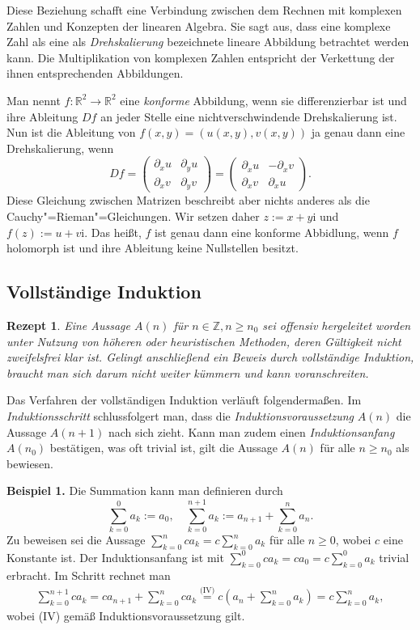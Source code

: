 \documentclass[a4paper,10pt,fleqn,twocolumn,twoside,dvipdfmx]{scrartcl}
\theoremstyle{rmbox}
\newtheorem{Rezept}{Rezept}[section]
\newcommand{\strong}[1]{\textsf{\textbf{#1}}}
\newcommand{\ui}{\mathrm{i}}
\newcommand{\Z}{\mathbb Z}
\newcommand{\R}{\mathbb R}
\begin{document}
Diese Beziehung schafft eine Verbindung zwischen dem
Rechnen mit komplexen Zahlen und Konzepten der linearen Algebra.
Sie sagt aus, dass eine komplexe Zahl als eine als \emph{Drehskalierung}
bezeichnete lineare Abbildung betrachtet werden kann. Die Multiplikation
von komplexen Zahlen entspricht der Verkettung der ihnen entsprechenden
Abbildungen.

Man nennt $f\colon\R^2\to\R^2$ eine \emph{konforme} Abbildung, wenn sie
differenzierbar ist und ihre Ableitung $Df$ an jeder Stelle
eine nichtverschwindende Drehskalierung ist. Nun ist die
Ableitung von $f(x,y)=(u(x,y),v(x,y))$ ja genau dann eine
Drehskalierung, wenn
\[Df = \begin{pmatrix}
\partial_x u & \partial_y u\\
\partial_x v & \partial_y v
\end{pmatrix} = \begin{pmatrix}
\partial_x u & -\partial_x v\\
\partial_x v & \partial_x u
\end{pmatrix}.\]
Diese Gleichung zwischen Matrizen beschreibt aber nichts anderes als
die Cauchy"=Rieman"=Gleichungen. Wir setzen daher $z:=x+y\ui$ und
$f(z):=u+v\ui$. Das heißt, $f$ ist genau dann eine konforme
Abbidlung, wenn $f$ holomorph ist und ihre Ableitung keine
Nullstellen besitzt.

\subsection{Vollständige Induktion}

\begin{Rezept}
Eine Aussage $A(n)$ für $n\in\Z, n\ge n_0$ sei offensiv
hergeleitet worden unter Nutzung von höheren oder
heuristischen Methoden, deren Gültigkeit nicht zweifelsfrei
klar ist. Gelingt anschließend ein Beweis durch vollständige
Induktion, braucht man sich darum nicht weiter kümmern
und kann voranschreiten.
\end{Rezept}
Das Verfahren der vollständigen Induktion verläuft folgendermaßen.
Im \emph{Induktionsschritt} schlussfolgert man, dass die
\emph{Induktionsvoraussetzung} $A(n)$ die Aussage $A(n+1)$ nach sich
zieht. Kann man zudem einen \emph{Induktionsanfang}
$A(n_0)$ bestätigen, was oft trivial ist, gilt die Aussage $A(n)$
für alle $n\ge n_0$ als bewiesen.

\strong{Beispiel 1.} Die Summation kann man definieren durch%
\[\sum_{k=0}^0 a_k := a_0,\quad
\sum_{k=0}^{n+1} a_k := a_{n+1}+\sum_{k=0}^n a_n.
\]
Zu beweisen sei die Aussage $\sum_{k=0}^n ca_k = c\sum_{k=0}^n a_k$
für alle $n\ge 0$, wobei
$c$ eine Konstante ist. Der Induktionsanfang ist mit
$\sum_{k=0}^0 ca_k = ca_0 = c\sum_{k=0}^0 a_k$
trivial erbracht. Im Schritt rechnet man%
\begin{gather*}
\sum_{k=0}^{n+1} ca_k = ca_{n+1}+\sum_{k=0}^n ca_k
\!\!\stackrel{\text{(IV)}}=\! c(a_n + \sum_{k=0}^n a_k)
= c\!\sum_{k=0}^n a_k,
\end{gather*}
wobei (IV) gemäß Induktionsvoraussetzung gilt.
\end{document}
